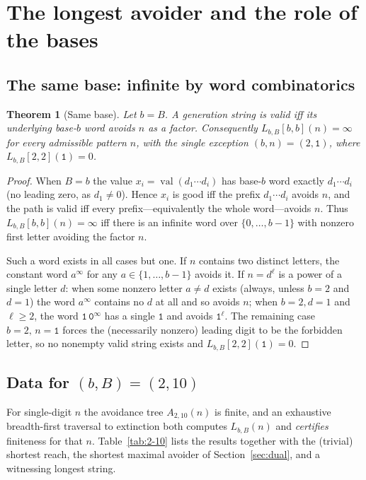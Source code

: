 \documentclass[11pt]{article}
\theoremstyle{plain}
\newtheorem{theorem}{Theorem}
\theoremstyle{definition}
\theoremstyle{remark}
\DeclareMathOperator{\val}{val}
\newcommand{\Lbb}{L_{b,B}}
\begin{document}
\section{The longest avoider and the role of the bases}

\subsection{The same base: infinite by word combinatorics}

\begin{theorem}[Same base]\label{thm:same}
Let $b=B$. A generation string is valid iff its underlying base-$b$ word avoids $n$ as a factor. Consequently $\Lbb[b,b](n)=\infty$ for every admissible pattern $n$, with the single exception $(b,n)=(2,\texttt{1})$, where $\Lbb[2,2](\texttt{1})=0$.
\end{theorem}

\begin{proof}
When $B=b$ the value $x_i=\val(d_1\cdots d_i)$ has base-$b$ word exactly $d_1\cdots d_i$ (no leading zero, as $d_1\neq0$). Hence $x_i$ is good iff the prefix $d_1\cdots d_i$ avoids $n$, and the path is valid iff every prefix---equivalently the whole word---avoids $n$. Thus $\Lbb[b,b](n)=\infty$ iff there is an infinite word over $\{0,\dots,b-1\}$ with nonzero first letter avoiding the factor $n$.

Such a word exists in all cases but one. If $n$ contains two distinct letters, the constant word $a^{\infty}$ for any $a\in\{1,\dots,b-1\}$ avoids it. If $n=d^{\ell}$ is a power of a single letter $d$: when some nonzero letter $a\neq d$ exists (always, unless $b=2$ and $d=1$) the word $a^{\infty}$ contains no $d$ at all and so avoids $n$; when $b=2,d=1$ and $\ell\ge 2$, the word $\texttt{1}\,\texttt{0}^{\infty}$ has a single $\texttt{1}$ and avoids $\texttt{1}^{\ell}$. The remaining case $b=2,\,n=\texttt{1}$ forces the (necessarily nonzero) leading digit to be the forbidden letter, so no nonempty valid string exists and $\Lbb[2,2](\texttt{1})=0$.
\end{proof}

\subsection{Data for $(b,B)=(2,10)$}

For single-digit $n$ the avoidance tree $A_{2,10}(n)$ is finite, and an exhaustive breadth-first traversal to extinction both computes $\Lbb(n)$ and \emph{certifies} finiteness for that $n$. Table~\ref{tab:2-10} lists the results together with the (trivial) shortest reach, the shortest maximal avoider of Section~\ref{sec:dual}, and a witnessing longest string.
\end{document}
